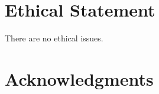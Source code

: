 \documentclass{article}
\begin{document}
\section*{Ethical Statement}

There are no ethical issues.

\section*{Acknowledgments}






\end{document}
